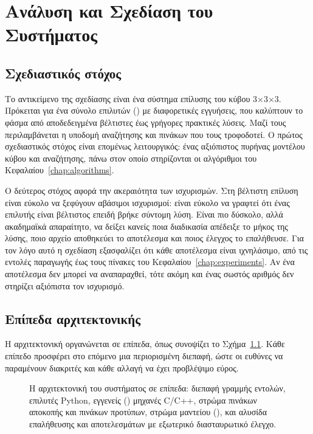\chapter{Ανάλυση και Σχεδίαση του Συστήματος}
\label{chap:design}

\section{Σχεδιαστικός στόχος}
\label{sec:design-goal}
Το αντικείμενο της σχεδίασης είναι ένα σύστημα επίλυσης του κύβου 3×3×3. Πρόκειται για ένα σύνολο επιλυτών () με διαφορετικές εγγυήσεις, που καλύπτουν το φάσμα από αποδεδειγμένα βέλτιστες έως γρήγορες πρακτικές λύσεις. Μαζί τους περιλαμβάνεται η υποδομή αναζήτησης και πινάκων που τους τροφοδοτεί. Ο πρώτος σχεδιαστικός στόχος είναι επομένως λειτουργικός: ένας αξιόπιστος πυρήνας μοντέλου κύβου και αναζήτησης, πάνω στον οποίο στηρίζονται οι αλγόριθμοι του Κεφαλαίου~\ref{chap:algorithms}.

Ο δεύτερος στόχος αφορά την ακεραιότητα των ισχυρισμών. Στη βέλτιστη επίλυση είναι εύκολο να ξεφύγουν αβάσιμοι ισχυρισμοί: είναι εύκολο να γραφτεί ότι ένας επιλυτής είναι βέλτιστος επειδή βρήκε σύντομη λύση. Είναι πιο δύσκολο, αλλά ακαδημαϊκά απαραίτητο, να δείξει κανείς ποια διαδικασία απέδειξε το μήκος της λύσης, ποιο αρχείο αποθηκεύει το αποτέλεσμα και ποιος έλεγχος το επαλήθευσε. Για τον λόγο αυτό η σχεδίαση εξασφαλίζει ότι κάθε αποτέλεσμα είναι ιχνηλάσιμο, από τις εντολές παραγωγής έως τους πίνακες του Κεφαλαίου~\ref{chap:experiments}. Αν ένα αποτέλεσμα δεν μπορεί να αναπαραχθεί, τότε ακόμη και ένας σωστός αριθμός δεν στηρίζει αξιόπιστα τον ισχυρισμό.

\section{Επίπεδα αρχιτεκτονικής}
\label{sec:design-architecture}
Η αρχιτεκτονική οργανώνεται σε επίπεδα, όπως συνοψίζει το Σχήμα~\ref{fig:architecture}. Κάθε επίπεδο προσφέρει στο επόμενο μια περιορισμένη διεπαφή, ώστε οι ευθύνες να παραμένουν διακριτές και κάθε αλλαγή να έχει προβλέψιμο εύρος.

\begin{figure}[htbp]
\centering

\caption{Η αρχιτεκτονική του συστήματος σε επίπεδα: διεπαφή γραμμής εντολών, επιλυτές Python, εγγενείς () μηχανές C/C++, στρώμα πινάκων αποκοπής και πινάκων προτύπων, στρώμα μαντείου (), και αλυσίδα επαλήθευσης και αποτελεσμάτων με εξωτερικό διασταυρωτικό έλεγχο.}
\label{fig:architecture}
\end{figure}

